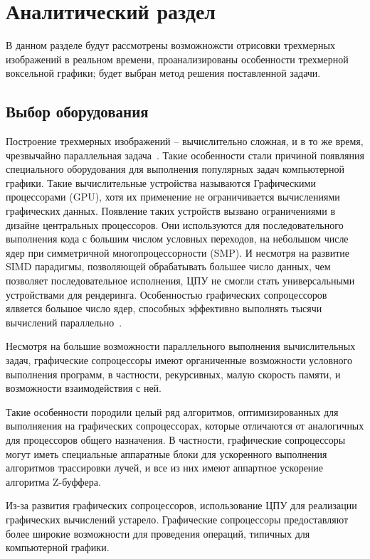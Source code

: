 \chapter{Аналитический раздел}

В данном разделе будут рассмотрены возможножсти отрисовки 
трехмерных изображений в реальном времени, проанализированы особенности трехмерной 
воксельной графики; будет выбран метод решения поставленной задачи.

\section{Выбор оборудования}

Построение трехмерных изображений -- вычислительно сложная, и в то же время, чрезвычайно 
параллельная задача~\cite{DaBPP}. Такие особенности стали причиной появляния специального оборудования 
для выполнения популярных задач компьютерной графики. Такие вычислительные устройства
называются Графическими процессорами (GPU), хотя их применение не ограничивается вычислениями
графических данных. Появление таких устройств вызвано ограничениями в дизайне центральных
процессоров. Они используются для последовательного выполнения кода с большим числом условных 
переходов, на небольшом числе ядер при симметричной многопроцессорности (SMP). И несмотря на 
развитие SIMD парадигмы, позволяющей обрабатывать большее число данных, чем позволяет
последовательное исполнения, ЦПУ не смогли стать универсальными устройствами для рендеринга.
Особенностью графических сопроцессоров ялвяется большое число ядер, способных эффективно 
выполнять тысячи вычислений параллельно~\cite{ACLaG}.

Несмотря на большие возможности параллельного выполнения вычислительных задач,
графические сопроцессоры имеют органиченные возможности условного выполнения программ, в 
частности, рекурсивных, малую скорость памяти, и возможности взаимодействия с ней.

Такие особенности породили целый ряд алгоритмов, оптимизированных для выполняения на графических
сопроцессорах, которые отличаются от аналогичных для процессоров общего назначения. В частности, 
графические сопроцессоры могут иметь специальные аппаратные блоки для ускоренного выполнения 
алгоритмов трассировки лучей, и все из них имеют аппартное ускорение алгоритма Z-буффера. ~\cite{RTiv}

Из-за развития графических сопроцессоров, использование ЦПУ для реализации графических
вычислений устарело. Графические сопроцессоры предоставляют более широкие возможности 
для проведения операций, типичных для компьютерной графики. 

